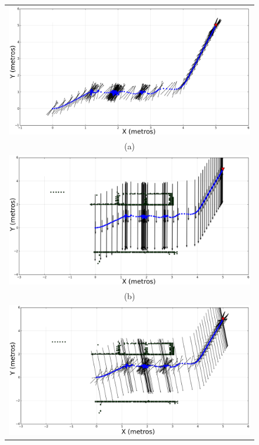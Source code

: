 \begin{figure}%
    \centering
    \begin{tabular}{c}
      \multicolumn{1}{c}{\includegraphics[width=.77\textwidth]{images/fattr_slam.eps}}\\
      \multicolumn{1}{c}{(a)}\\
      \multicolumn{1}{c}{\includegraphics[width=.77\textwidth]{images/frep_slam.eps}}\\
      \multicolumn{1}{c}{(b)}\\
      \multicolumn{1}{c}{\includegraphics[width=.77\textwidth]{images/fnav_slam.eps}}\\

\end{tabular}
\end{figure}
